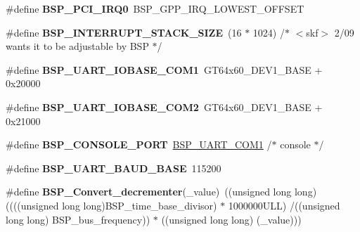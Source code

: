 \begin{DoxyCompactItemize}
\#define {\bfseries B\+S\+P\+\_\+\+P\+C\+I\+\_\+\+I\+R\+Q0}~B\+S\+P\+\_\+\+G\+P\+P\+\_\+\+I\+R\+Q\+\_\+\+L\+O\+W\+E\+S\+T\+\_\+\+O\+F\+F\+S\+ET
\item 
\mbox{\label{group__RTEMSBSPsPowerPCMVME5500_gaae9597381ef6e8194012ad0c6168cf79}} 
\#define {\bfseries B\+S\+P\+\_\+\+I\+N\+T\+E\+R\+R\+U\+P\+T\+\_\+\+S\+T\+A\+C\+K\+\_\+\+S\+I\+ZE}~(16 $\ast$ 1024) /$\ast$ $<$skf$>$ 2/09 wants it to be adjustable by B\+SP $\ast$/
\item 
\mbox{\label{group__RTEMSBSPsPowerPCMVME5500_gab259f83c40cdf929716d93a04b510006}} 
\#define {\bfseries B\+S\+P\+\_\+\+U\+A\+R\+T\+\_\+\+I\+O\+B\+A\+S\+E\+\_\+\+C\+O\+M1}~G\+T64x60\+\_\+\+D\+E\+V1\+\_\+\+B\+A\+SE + 0x20000
\item 
\mbox{\label{group__RTEMSBSPsPowerPCMVME5500_ga2475131339f3941237ce2f311cdc4492}} 
\#define {\bfseries B\+S\+P\+\_\+\+U\+A\+R\+T\+\_\+\+I\+O\+B\+A\+S\+E\+\_\+\+C\+O\+M2}~G\+T64x60\+\_\+\+D\+E\+V1\+\_\+\+B\+A\+SE + 0x21000
\item 
\mbox{\label{group__RTEMSBSPsPowerPCMVME5500_ga2c88f414089ddba7b640655bcbeffc96}} 
\#define {\bfseries B\+S\+P\+\_\+\+C\+O\+N\+S\+O\+L\+E\+\_\+\+P\+O\+RT}~\mbox{\hyperlink{group__i386__uart_gaa1561064cc8499388f7512347b434d25}{B\+S\+P\+\_\+\+U\+A\+R\+T\+\_\+\+C\+O\+M1}}  /$\ast$ console $\ast$/
\item 
\mbox{\label{group__RTEMSBSPsPowerPCMVME5500_ga4b41bd0ec37c1f8b14ced54ab3a8a6f7}} 
\#define {\bfseries B\+S\+P\+\_\+\+U\+A\+R\+T\+\_\+\+B\+A\+U\+D\+\_\+\+B\+A\+SE}~115200
\item 
\mbox{\label{group__RTEMSBSPsPowerPCMVME5500_ga5b3b7a8f2f89a6110c93e0229f67c104}} 
\#define {\bfseries B\+S\+P\+\_\+\+Convert\+\_\+decrementer}(\+\_\+value)~((unsigned long long) ((((unsigned long long)B\+S\+P\+\_\+time\+\_\+base\+\_\+divisor) $\ast$ 1000000\+U\+L\+L) /((unsigned long long) B\+S\+P\+\_\+bus\+\_\+frequency)) $\ast$ ((unsigned long long) (\+\_\+value)))
\item 
\mbox{\label{group__RTEMSBSPsPowerPCMVME5500_ga86d4f9aa98431100692e31068070a8df}} 

\end{DoxyCompactItemize}
